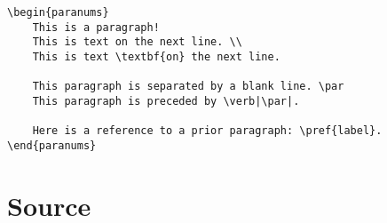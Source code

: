 \documentclass{article}
\begin{document}
        \begin{verbatim}
\begin{paranums}
    This is a paragraph!
    This is text on the next line. \\
    This is text \textbf{on} the next line.

    This paragraph is separated by a blank line. \par
    This paragraph is preceded by \verb|\par|.

    Here is a reference to a prior paragraph: \pref{label}.
\end{paranums}
        \end{verbatim}

    \section{Source}
        \inputminted{latex}{paranums.sty}
\end{document}
